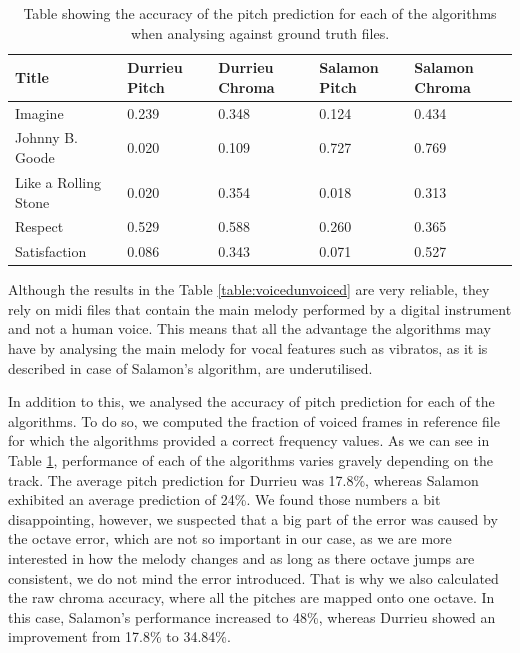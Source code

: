 \begin{table}
\begin{center}
\begin{tabular} {| p{5cm}| p{1.75cm} | p{1.75cm} | p{1.75cm} | p{1.75cm} |} \hline
Title 	& Durrieu Pitch & Durrieu Chroma & Salamon Pitch & Salamon Chroma \\ \hline \hline
Imagine						& 0.239		& 0.348		& 0.124			& 0.434		\\	\hline
Johnny B. Goode		& 0.020		& 0.109		& 0.727			& 0.769		\\ 	\hline
Like a Rolling Stone	& 0.020		& 0.354		& 0.018			& 0.313		\\ 	\hline
Respect						& 0.529		& 0.588		& 0.260			& 0.365		\\ 	\hline
Satisfaction				& 0.086		& 0.343		& 0.071			& 0.527		\\	\hline
\end{tabular}
\caption{Table showing the accuracy of the pitch prediction for each of the algorithms when analysing against ground truth files.}
\label{table:melodypitchchroma}
\end{center}
\end{table}


Although the results in the Table \ref{table:voicedunvoiced} are very reliable, they rely on midi files that contain the main melody performed by a digital instrument and not a human voice. This means that all the advantage the algorithms may have by analysing the main melody for vocal features such as vibratos, as it is described in case of Salamon's algorithm, are underutilised. 

In addition to this, we analysed the accuracy of pitch prediction for each of the algorithms. 
To do so, we computed the fraction of voiced frames in reference file for which the algorithms provided a correct frequency values. As we can see in Table \ref{table:melodypitchchroma}, performance of each of the algorithms varies gravely depending on the track. The average pitch prediction for Durrieu was  17.8\%, whereas Salamon exhibited an average prediction of 24\%. We found those numbers a bit disappointing, however, we suspected that a big part of the error was caused by the octave error, which are not so important in our case, as we are more interested in how the melody changes and as long as there octave jumps are consistent, we do not mind the error introduced. That is why we also calculated the raw chroma accuracy, where all the pitches are mapped onto one octave. In this case, Salamon's performance increased to 48\%, whereas Durrieu showed an improvement from 17.8\% to 34.84\%.

